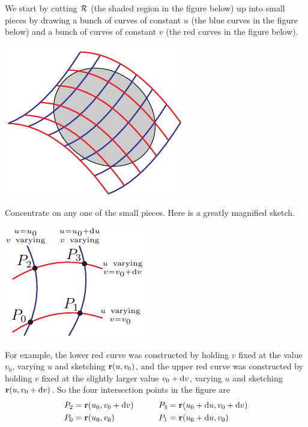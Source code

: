 We start by cutting $\mathcal{R}$ (the shaded region in the figure below) 
up into small pieces by drawing a bunch of curves of constant $u$ 
(the blue curves in the figure below) and a bunch of curves of 
constant $v$ (the red curves in the figure below).
\begin{nfig}
\begin{center}
    \includegraphics{RSlice.pdf}
\end{center}
\end{nfig}
Concentrate on any one of the small pieces. Here is a greatly magnified
sketch.
\begin{nfig}
\begin{center}
    \includegraphics{dA.pdf}
\end{center}
\end{nfig}
For example, the  lower red curve was constructed by holding $v$ fixed 
at the value $v_0$, varying $u$ and sketching $\mathbf{r}(u,v_0)$, and 
the  upper red curve was constructed by holding $v$ fixed 
at the slightly larger value $v_0+\mathrm{d}v$, varying $u$ and 
sketching $\mathbf{r}(u,v_0+\mathrm{d}v)$. So the four intersection points in 
the figure are
\begin{alignat*}{3}
P_2&=\mathbf{r}(u_0, v_0+\mathrm{d}v) &\qquad
   P_3&=\mathbf{r}(u_0+\mathrm{d}u, v_0+\mathrm{d}v) \\
P_0&=\mathbf{r}(u_0, v_0) &
   P_1&=\mathbf{r}(u_0+\mathrm{d}u, v_0) 
\end{alignat*}
